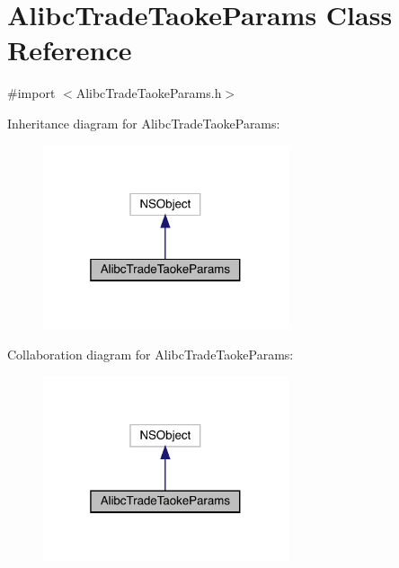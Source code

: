 \hypertarget{interface_alibc_trade_taoke_params}{}\section{Alibc\+Trade\+Taoke\+Params Class Reference}
\label{interface_alibc_trade_taoke_params}


{\ttfamily \#import $<$Alibc\+Trade\+Taoke\+Params.\+h$>$}



Inheritance diagram for Alibc\+Trade\+Taoke\+Params\+:\nopagebreak
\begin{figure}[H]
\begin{center}
\leavevmode
\includegraphics[width=205pt]{interface_alibc_trade_taoke_params__inherit__graph}
\end{center}
\end{figure}


Collaboration diagram for Alibc\+Trade\+Taoke\+Params\+:\nopagebreak
\begin{figure}[H]
\begin{center}
\leavevmode
\includegraphics[width=205pt]{interface_alibc_trade_taoke_params__coll__graph}
\end{center}
\end{figure}
